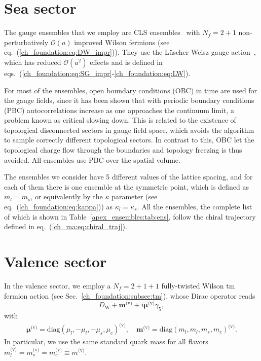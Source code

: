 \section{Sea sector}
\label{ch_ma:sec:Sea}

The gauge ensembles that we employ are CLS ensembles~\cite{CLS} with $N_f=2+1$ non-perturbatively $\mathcal{O}(a)$ improved Wilson fermions (see eq.~(\ref{ch_foundation:eq:DW_impr})). They use the Lüscher-Weisz gauge action~\cite{}, which has reduced $\mathcal{O}(a^2)$ effects and is defined in eqs.~(\ref{ch_foundation:eq:SG_impr}-\ref{ch_foundation:eq:LW}).

For most of the ensembles, open boundary conditions (OBC) in time are used for the gauge fields, since it has been shown that with periodic boundary conditions (PBC) autocorrelations increase as one approaches the continuum limit, a problem known as critical slowing down. This is related to the existence of topological disconnected sectors in gauge field space, which avoids the algorithm to sample correctly different topological sectors. In contrast to this, OBC let the topological charge flow through the boundaries and topology freezing is thus avoided. All ensembles use PBC over the spatial volume.

The ensembles we consider have 5 different values of the lattice spacing, and for each of them there is one ensemble at the symmetric point, which is defined as $m_l=m_s$, or equivalently by the $\kappa$ parameter (see eq.~(\ref{ch_foundation:eq:kappa})) as $\kappa_l=\kappa_s$. All the ensembles, the complete list of which is shown in Table~\ref{apex_ensembles:tab:ens}, follow the chiral trajectory defined in eq.~(\ref{ch_ma:eq:chiral_traj}).




\section{Valence sector}
\label{ch_ma:sec:Valence}

In the valence sector, we employ a $N_f=2+1+1$ fully-twisted Wilson tm fermion action (see Sec.~\ref{ch_foundation:subsec:tm}), whose Dirac operator reads
\begin{equation}
D_{\textrm{W}}+\boldsymbol{m}^{\textrm{(v)}}+i\boldsymbol{\mu}^{\textrm{(v)}}\gamma_5,
\end{equation}
with 
\begin{gather}
\boldsymbol{\mu}^{\textrm{(v)}}={\textrm{diag}}(\mu_l,-\mu_l,-\mu_s,\mu_c)^{\textrm{(v)}}, \quad
\boldsymbol{m}^{\textrm{(v)}}={\textrm{diag}}(m_l,m_l,m_s,m_c)^{\textrm{(v)}}.
\end{gather}
In particular, we use the same standard quark mass for all flavors $m_l^{\textrm{(v)}}=m_s^{\textrm{(v)}}=m_c^{\textrm{(v)}}\equiv m^{\textrm{(v)}}$.

